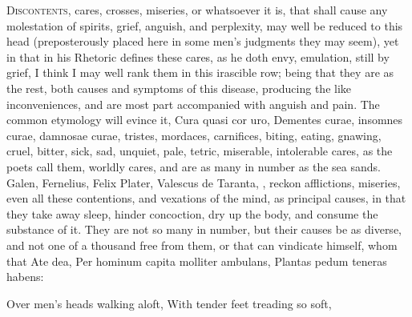 {{\lettrine{D}{iscontents}, cares, crosses, miseries, or whatsoever it is, that shall
cause any molestation of spirits, grief, anguish, and perplexity, may
well be reduced to this head (preposterously placed here in some men's
judgments they may seem), yet in that \Aristotle in his Rhetoric
defines these cares, as he doth envy, emulation, \etc{} still by grief, I
think I may well rank them in this irascible row; being that they are
as the rest, both causes and symptoms of this disease, producing the
like inconveniences, and are most part accompanied with anguish and
pain. The common etymology will evince it, Cura quasi cor uro, Dementes
curae, insomnes curae, damnosae curae, tristes, mordaces, carnifices,
\etc{} biting, eating, gnawing, cruel, bitter, sick, sad, unquiet, pale,
tetric, miserable, intolerable cares, as the poets call them,
worldly cares, and are as many in number as the sea sands. Galen,
Fernelius, Felix Plater, Valescus de Taranta, \etc{}, reckon afflictions,
miseries, even all these contentions, and vexations of the mind, as
principal causes, in that they take away sleep, hinder concoction, dry
up the body, and consume the substance of it. They are not so many in
number, but their causes be as diverse, and not one of a thousand free
from them, or that can vindicate himself, whom that Ate dea,
Per hominum capita molliter ambulans,
Plantas pedum teneras habens:

Over men's heads walking aloft,
With tender feet treading so soft,

}}
